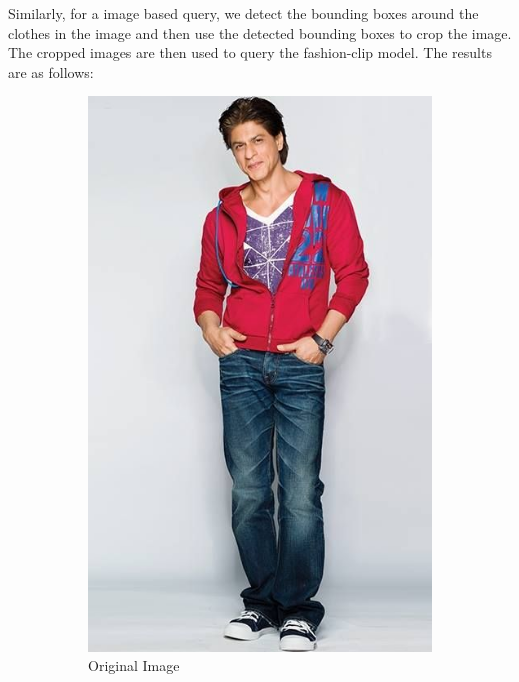Similarly, for a image based query, we detect the bounding boxes around the clothes in the image and then use the detected bounding boxes to crop the image. The cropped images are then used to query the fashion-clip model. The results are as follows:


\begin{figure}[H]
  \centering
  \begin{subfigure}[b]{0.3\textwidth}
      \includegraphics[width=\textwidth]{images/og_image.png}
      \caption{Original Image}
  \end{subfigure}
  \begin{subfigure}[b]{0.3\textwidth}

\end{subfigure}
\end{figure}
